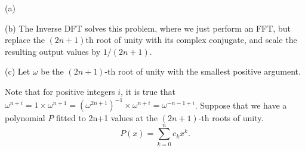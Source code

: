 \documentclass{article}
\begin{document}
\begin{solution}

    (a)

    (b) The Inverse DFT solves this problem, where we just perform an FFT, 
    but replace the $(2n+1)$th root of unity with its complex conjugate, and scale the 
    resulting output values by $1/(2n+1)$.

    (c) Let $\omega$ be the $(2n+1)$-th root of unity with the smallest positive argument.

    Note that for positive integers $i$, it is true that $\omega^{n+i}=1\times\omega^{n+1}=(\omega^{2n+1})^{-1}\times\omega^{n+i}=\omega^{-n-1+i}$.
    Suppose that we have a polynomial $P$ fitted to 2n+1 values at the $(2n+1)$-th roots of unity.
    $$P(x)=\sum_{k=0}^{n}c_kx^k.$$
\end{solution}
\end{document}
